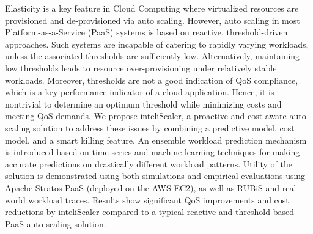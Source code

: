 Elasticity is a key feature in Cloud Computing where virtualized resources are provisioned and de-provisioned via auto scaling. However, auto scaling in most Platform-as-a-Service (PaaS) systems is based on reactive, threshold-driven approaches. Such systems are incapable of catering to rapidly varying workloads, unless the associated thresholds are sufficiently low. Alternatively, maintaining low thresholds leads to resource over-provisioning under relatively stable workloads. Moreover, thresholds are not a good indication of QoS compliance, which is a key performance indicator of a cloud application. Hence, it is nontrivial to determine an optimum threshold while minimizing costs and meeting QoS demands.  We propose inteliScaler, a proactive and cost-aware auto scaling solution to address these issues by combining a predictive model, cost model, and a smart killing feature. An ensemble workload prediction mechanism is introduced based on time series and machine learning techniques for making accurate predictions on drastically different workload patterns. Utility of the solution is demonstrated using both simulations and empirical evaluations using Apache Stratos PaaS (deployed on the AWS EC2), as well as RUBiS and real-world workload traces. Results show significant QoS improvements and cost reductions by inteliScaler compared to a typical reactive and threshold-based PaaS auto scaling solution.